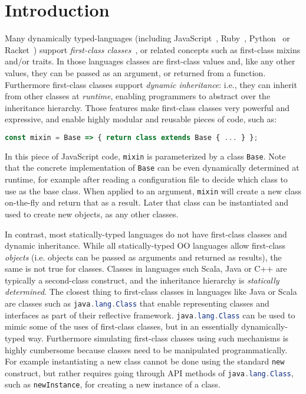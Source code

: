 \section{Introduction}
\label{sec:intro}

Many dynamically typed-languages (including JavaScript~\cite{javascript}, Ruby~\cite{ruby}, Python~\cite{python}
or Racket~\cite{racket}) support \emph{first-class classes}~\cite{DBLP:conf/aplas/FlattFF06}, or related concepts
such as first-class mixins and/or traits. In those languages classes
are first-class values and, like any other values, they can be
passed as an argument, or returned from a function. Furthermore
first-class classes support \emph{dynamic inheritance}: i.e., they
can inherit from other classes at \emph{runtime}, enabling
programmers to abstract over the inheritance hierarchy. 
Those features make first-class classes very powerful and expressive,
and enable highly modular and reusable pieces of code, such as:
\begin{lstlisting}[language=JavaScript]
const mixin = Base => { return class extends Base { ... } };
\end{lstlisting}
In this piece of JavaScript code, \lstinline{mixin} is
parameterized by a class \lstinline{Base}. Note that the concrete
implementation of \lstinline{Base} can be 
even dynamically determined at runtime, for example 
after reading a configuration file to decide which 
class to use as the base class.  When applied to an argument, 
\lstinline{mixin} will create a new class on-the-fly and return that
as a result. Later that class can be instantiated and used to create 
new objects, as any other classes.

In contrast, most statically-typed
languages do not have first-class classes and dynamic
inheritance. While all statically-typed OO languages allow first-class
\emph{objects} (i.e. objects can be passed as arguments and returned
as results), the same is not true for classes. Classes in languages such
Scala, Java or C++ are typically a second-class construct, and the
inheritance hierarchy is \emph{statically determined}. The closest thing
to first-class classes in 
languages like Java or Scala are classes such as 
\lstinline[language=java]{java.lang.Class} that enable representing classes and
interfaces as part of their reflective framework. \lstinline[language=java]{java.lang.Class} can be used to
mimic some of the uses of first-class classes, but in an essentially
dynamically-typed way. Furthermore simulating first-class classes
using such mechanisms is highly cumbersome because classes need to be
manipulated programmatically. For example instantiating a new class
cannot be done using the standard \lstinline{new} construct, but
rather requires going through API methods of
\lstinline[language=java]{java.lang.Class}, such as \lstinline{newInstance}, for
creating a new instance of a class.

